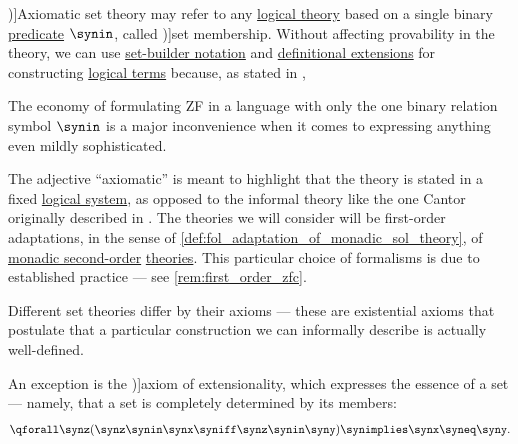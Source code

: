 \begin{definition}\label{def:axiomatic_set_theory}\mimprovised
  \term[en=axiomatic set theory (\cite[xii]{Hinman2005Logic})]{Axiomatic set theory} may refer to any \hyperref[def:logical_theory]{logical theory} based on a single binary \hyperref[con:predicate_logic/predicate]{predicate} \( \synin \), called \term[en=membership relation (\cite[5]{Jech2006SetTheory})]{set membership}. Without affecting provability in the theory, we can use \hyperref[def:set_theory_definition]{set-builder notation} and \hyperref[def:fol_definitional_extension]{definitional extensions} for constructing \hyperref[def:fol_term]{logical terms} because, as stated in \cite[rem. 6.1.8]{Hinman2005Logic},
  \begin{displayquote}
    The economy of formulating \textsf{ZF} in a language with only the one binary relation symbol \( \synin \) is a major inconvenience when it comes to expressing anything even mildly sophisticated.
  \end{displayquote}

  The adjective \enquote{axiomatic} is meant to highlight that the theory is stated in a fixed \hyperref[con:logical_system]{logical system}, as opposed to the informal theory like the one Cantor originally described in \cite{Кантор1985Многообразия}. The theories we will consider will be first-order adaptations, in the sense of \cref{def:fol_adaptation_of_monadic_sol_theory}, of \hyperref[def:second_order_logic]{monadic second-order} \hyperref[def:hol_theory]{theories}. This particular choice of formalisms is due to established practice --- see \cref{rem:first_order_zfc}.

  \begin{thmenum}
     Different set theories differ by their axioms --- these are existential axioms that postulate that a particular construction we can informally describe is actually well-defined.

    An exception is the \term[ru=аксиома объёмности (\cite[180]{Герасимов2014Вычислимость})]{axiom of extensionality}, which expresses the essence of a set --- namely, that a set is completely determined by its members:
    \begin{equation}\label{eq:def:axiomatic_set_theory/extensionality}
      \qforall \synz (\synz \synin \synx \syniff \synz \synin \syny) \synimplies \synx \syneq \syny.
    \end{equation}


\end{thmenum}
\end{definition}
